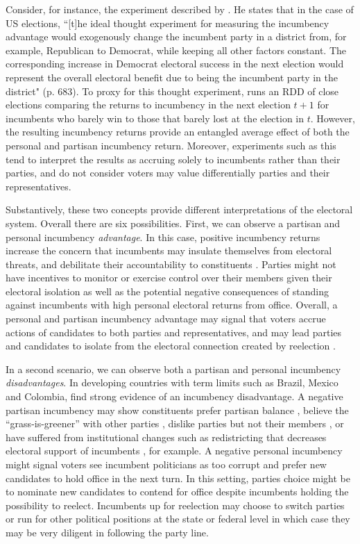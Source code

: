Consider, for instance, the experiment described by \citet{lee_2008}. He states that in the case of US elections, ``[t]he ideal thought experiment for measuring the incumbency advantage would exogenously change the incumbent party in a district from, for example, Republican to Democrat, while keeping all other factors constant. The corresponding increase in Democrat electoral success in the next election would represent the overall electoral benefit due to being the incumbent party in the district" (p. 683). To proxy for this thought experiment, \citet{lee_2008} runs an RDD of close elections comparing the returns to incumbency in the next election $t+1$ for incumbents who barely win to those that barely lost at the election in $t$. However, the resulting incumbency returns provide an entangled average effect of both the personal and partisan incumbency return. Moreover, experiments such as this tend to interpret the results as accruing solely to incumbents rather than their parties, and do not consider voters may value differentially parties and their representatives. 

Substantively, these two concepts provide different interpretations of the electoral system. Overall there are six possibilities. First, we can observe a  partisan and personal incumbency \emph{advantage}. In this case, positive incumbency returns increase the concern that incumbents may insulate themselves from electoral threats, and debilitate their accountability to constituents \citep{ashworth_etal_2019, cox_katz_2002}. Parties might not have incentives to monitor or exercise control over their members given their electoral isolation as well as the potential negative consequences of standing against incumbents with high personal electoral returns from office. Overall, a personal and partisan incumbency advantage may signal that voters accrue actions of candidates to both parties and representatives, and may lead parties and candidates to isolate from the electoral connection created by reelection \citep{mayhew_1974}. 

 In a second scenario, we can observe both a partisan and personal incumbency \emph{disadvantages}. In developing countries with term limits such as Brazil, Mexico and Colombia, \citet{klasnja_titiunik_2017} find strong evidence of an incumbency disadvantage. A negative partisan incumbency may show constituents prefer partisan balance \citep{folke_snyder_2012}, believe the ``grass-is-greener'' with other parties \citep{bhatia_turan_2013}, dislike parties but not their members \citep{parker_davidson_1979}, or have suffered from institutional changes such as redistricting that decreases electoral support of incumbents \citep{ansolabehere_snyder_2000, desposato_petrocik_2003}, for example. A negative personal incumbency might signal voters see incumbent politicians as too corrupt and prefer new candidates to hold office in the next turn. In this setting, parties choice might be to nominate new candidates to contend for office despite incumbents holding the possibility to reelect. Incumbents up for reelection may choose to switch parties or run for other political positions at the state or federal level in which case they may be very diligent in following the party line. 
  
